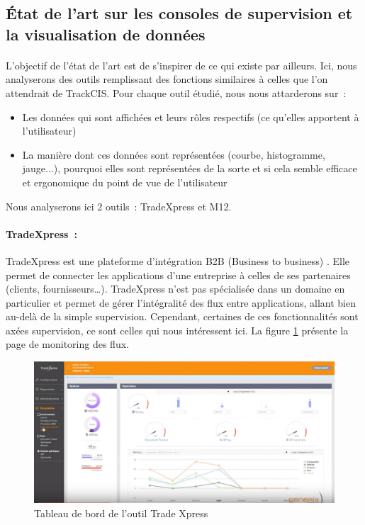 		\subsection{État de l'art sur les consoles de supervision et la visualisation de données}
			\paragraph{}
			L'objectif de l'état de l'art est de s'inspirer de ce qui existe par
			ailleurs.
			Ici, nous analyserons des outils remplissant des
			fonctions similaires à celles que l’on attendrait de TrackCIS. Pour chaque
			outil étudié, nous nous attarderons sur~:
			\begin{itemize}
			  \item Les données qui sont affichées et leurs rôles respectifs (ce qu'elles
			  apportent à l'utilisateur)
			  \item La manière dont ces données sont représentées (courbe, histogramme,
			  jauge...), pourquoi elles sont représentées de la sorte et si cela semble
			  efficace et ergonomique du point de vue de l’utilisateur
			\end{itemize}
			Nous analyserons ici 2 outils~: TradeXpress et M12.
			
			\paragraph{TradeXpress~:}
			TradeXpress est une plateforme d’intégration B2B (Business to business)
			\citep{gmi_connectivity_gateway_2014}.
			Elle permet de connecter les applications d’une entreprise à celles de ses
			partenaires (clients, fournisseurs…). TradeXpress n’est pas spécialisée dans
			un domaine en particulier et permet de gérer l’intégralité des flux entre
			applications, allant bien au-delà de la simple supervision. Cependant, certaines
			de ces fonctionnalités sont axées supervision, ce sont celles qui nous
			intéressent ici. La figure \ref{trade_xpress} présente la page de monitoring des
			flux.\newline
			\begin{figure}[H]
				\centering
				\includegraphics[width=16cm]{../img/part2/trade_xpress.png}
				\caption{\label{trade_xpress} Tableau de bord de l'outil Trade Xpress}
			\end{figure}
			
